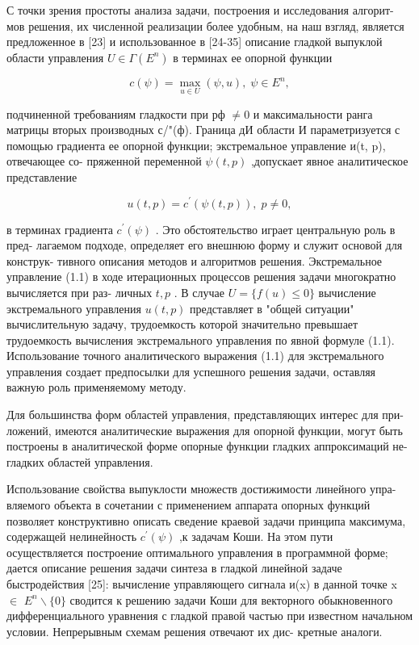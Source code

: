 \documentclass[10pt]{article}
\begin{document}
С точки зрения простоты анализа задачи, построения и исследования алгорит- мов решения, их численной реализации более удобным, на наш взгляд, является предложенное в [23] и использованное в [24-35] описание гладкой выпуклой области управления \(U \in  \Gamma \left( {E}^{n}\right)\) в терминах ее опорной функции

\[
c\left( \psi \right)  = \mathop{\max }\limits_{{u \in  U}}\left( {\psi ,u}\right) ,\;\psi  \in  {E}^{n},
\]

подчиненной требованиям гладкости при рф \(\neq\)0 и максимальности ранга матрицы вторых производных с/"(ф). Граница дИ области И параметризуется с помощью градиента ее опорной функции; экстремальное управление и(t, p), отвечающее со- пряженной переменной \(\psi \left( {t,p}\right)\) ,допускает явное аналитическое представление

\[
u\left( {t,p}\right)  = {c}^{\prime }\left( {\psi \left( {t,p}\right) }\right) ,\;p \neq  0, \tag{1.1}
\]

в терминах градиента \({c}^{\prime }\left( \psi \right)\) . Это обстоятельство играет центральную роль в пред- лагаемом подходе, определяет его внешнюю форму и служит основой для конструк- тивного описания методов и алгоритмов решения. Экстремальное управление (1.1) в ходе итерационных процессов решения задачи многократно вычисляется при раз- личных \(t,p\) . В случае \(U = \{ f\left( u\right)  \leq  0\}\) вычисление экстремального управления \(u\left( {t,p}\right)\) представляет в "общей ситуации" вычислительную задачу, трудоемкость которой значительно превышает трудоемкость вычисления экстремального управления по явной формуле (1.1). Использование точного аналитического выражения (1.1) для экстремального управления создает предпосылки для успешного решения задачи, оставляя важную роль применяемому методу.

Для большинства форм областей управления, представляющих интерес для при- ложений, имеются аналитические выражения для опорной функции, могут быть построены в аналитической форме опорные функции гладких аппроксимаций не- гладких областей управления.

Использование свойства выпуклости множеств достижимости линейного упра- вляемого объекта в сочетании с применением аппарата опорных функций позволяет конструктивно описать сведение краевой задачи принципа максимума, содержащей нелинейность \({c}^{\prime }\left( \psi \right)\) ,к задачам Коши. На этом пути осуществляется построение оптимального управления в программной форме; дается описание решения задачи синтеза в гладкой линейной задаче быстродействия [25]: вычисление управляющего сигнала и(x) в данной точке x \(\in\) \({E}^{n} \smallsetminus  \{ 0\}\) сводится к решению задачи Коши для векторного обыкновенного дифференциального уравнения с гладкой правой частью при известном начальном условии. Непрерывным схемам решения отвечают их дис- кретные аналоги.
\end{document}
